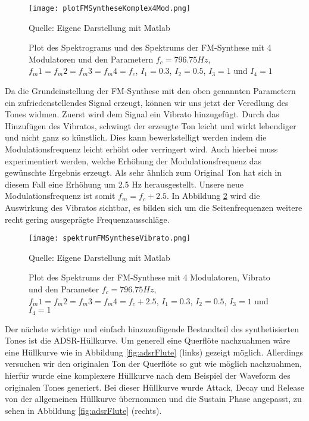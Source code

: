 \begin{figure} [ht]
\centering
  \texttt{[image: plotFMSyntheseKomplex4Mod.png]}
\caption{Plot des Spektrograms und des Spektrums der FM-Synthese mit 4 Modulatoren und den Parametern $f_c = 796.75 Hz$, $f_m1 = f_m2 = f_m3 = f_m4 = f_c$, $I_1 = 0.3$, $I_2 = 0.5$, $I_3 = 1$ und $I_4 = 1$}
\label{fig:plotFMSyntheseKomplex4Mod}
Quelle: Eigene Darstellung mit Matlab
\end{figure}

Da die Grundeinstellung der FM-Synthese mit den oben genannten Parametern ein zufriedenstellendes Signal erzeugt, können wir uns jetzt der Veredlung des Tones widmen. Zuerst wird dem Signal ein Vibrato hinzugefügt. Durch das Hinzufügen des Vibratos, schwingt der erzeugte Ton leicht und wirkt lebendiger und nicht ganz so künstlich. Dies kann bewerkstelligt werden indem die Modulationsfrequenz leicht erhöht oder verringert wird. Auch hierbei muss experimentiert werden, welche Erhöhung der Modulationsfrequenz das gewünschte Ergebnis erzeugt. Als sehr ähnlich zum Original Ton hat sich in diesem Fall eine Erhöhung um 2.5 Hz herausgestellt. Unsere neue Modulationsfrequenz ist somit $f_m = f_c + 2.5$. In Abbildung \ref{fig:spektrumFMSyntheseVibrato} wird die Auswirkung des Vibratos sichtbar, es bilden sich um die Seitenfrequenzen weitere recht gering ausgeprägte Frequenzausschläge.

\begin{figure} [ht]
\centering
  \texttt{[image: spektrumFMSyntheseVibrato.png]}
\caption{Plot des Spektrums der FM-Synthese mit 4 Modulatoren, Vibrato und den Parameter $f_c = 796.75 Hz$, $f_m1 = f_m2 = f_m3 = f_m4 = f_c + 2.5$, $I_1 = 0.3$, $I_2 = 0.5$, $I_3 = 1$ und $I_4 = 1$}
\label{fig:spektrumFMSyntheseVibrato}
Quelle: Eigene Darstellung mit Matlab
\end{figure}

Der nächste wichtige und einfach hinzuzufügende Bestandteil des synthetisierten Tones ist die ADSR-Hüllkurve. Um generell eine Querflöte nachzuahmen wäre eine Hüllkurve wie in Abbildung \ref{fig:adsrFlute} (links) gezeigt möglich. Allerdings versuchen wir den originalen Ton der Querflöte so gut wie möglich nachzuahmen, hierfür wurde eine komplexere Hüllkurve nach dem Beispiel der Waveform des originalen Tones generiert. Bei dieser Hüllkurve wurde Attack, Decay und Release von der allgemeinen Hüllkurve übernommen und die Sustain Phase angepasst, zu sehen in Abbildung \ref{fig:adsrFlute} (rechts). 

